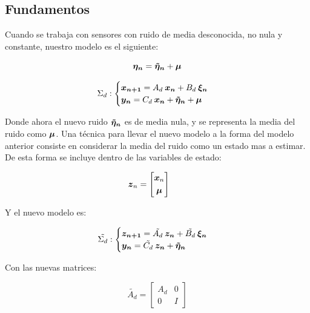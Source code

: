 \subsection{Fundamentos}

	Cuando se trabaja con sensores con ruido de media desconocida, no nula y constante, nuestro modelo es el siguiente:

	\begin{equation*}
		\boldsymbol{\eta_{n}} = \boldsymbol{\tilde{\eta}_{n}} + \boldsymbol{\mu}
	\end{equation*}

	\begin{equation*}
		\Sigma_{d}:
		\begin{cases}
			\boldsymbol{x_{n + 1}} = A_{d}\: \boldsymbol{x_{n}} + B_{d} \: \boldsymbol{\xi_{n}} \\
			\boldsymbol{y_{n}} = C_{d}\: \boldsymbol{x_{n}} + \boldsymbol{\tilde{\eta}_{n}} + \boldsymbol{\mu}
		\end{cases}
	\end{equation*}

	Donde ahora el nuevo ruido $\boldsymbol{\tilde{\eta}_{n}}$ es de media nula, y se representa la media del ruido como $\boldsymbol{\mu}$. Una técnica para llevar el nuevo modelo a la forma del modelo anterior consiste en considerar la media del ruido como un estado mas a estimar. De esta forma se incluye dentro de las variables de estado:

	\begin{equation*}
		\vect{z}_{n} = \begin{bmatrix} \vect{x}_{n} \\[0.3em] \vect{\mu}\end{bmatrix} \qquad%
	\end{equation*}
	
	Y el nuevo modelo es:
	
	\begin{equation*}
		\tilde{\Sigma_{d}}:
		\begin{cases}
			\boldsymbol{z_{n + 1}} = \tilde{A_{d}}\: \boldsymbol{z_{n}} + \tilde{B_{d}} \: \boldsymbol{\xi_{n}} \\
			\boldsymbol{y_{n}} = \tilde{C_{d}}\: \boldsymbol{z_{n}} + \boldsymbol{\tilde{\eta}_{n}}
		\end{cases}
	\end{equation*}

	Con las nuevas matrices:
	
	\begin{equation*}
			\tilde{A_{d}} = \begin{bmatrix} A_{d} & 0 \\[0.3em] 0 & I \end{bmatrix}
	\end{equation*}
	

